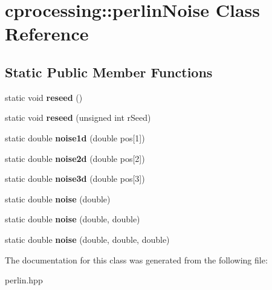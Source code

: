 \hypertarget{classcprocessing_1_1perlinNoise}{\section{cprocessing\-:\-:perlin\-Noise \-Class \-Reference}
\label{classcprocessing_1_1perlinNoise}
}
\subsection*{\-Static \-Public \-Member \-Functions}
\begin{DoxyCompactItemize}
\item 
\hypertarget{classcprocessing_1_1perlinNoise_a882acdba45346139eb9560d911d87c50}{static void {\bfseries reseed} ()}\label{classcprocessing_1_1perlinNoise_a882acdba45346139eb9560d911d87c50}

\item 
\hypertarget{classcprocessing_1_1perlinNoise_ae1fa46303805bdada3b7f0985c24f59b}{static void {\bfseries reseed} (unsigned int r\-Seed)}\label{classcprocessing_1_1perlinNoise_ae1fa46303805bdada3b7f0985c24f59b}

\item 
\hypertarget{classcprocessing_1_1perlinNoise_a2723ae0635c5f9d0de66d9f6c02f43de}{static double {\bfseries noise1d} (double pos\mbox{[}1\mbox{]})}\label{classcprocessing_1_1perlinNoise_a2723ae0635c5f9d0de66d9f6c02f43de}

\item 
\hypertarget{classcprocessing_1_1perlinNoise_a1bd09b9c338bb394589dfe364765ce22}{static double {\bfseries noise2d} (double pos\mbox{[}2\mbox{]})}\label{classcprocessing_1_1perlinNoise_a1bd09b9c338bb394589dfe364765ce22}

\item 
\hypertarget{classcprocessing_1_1perlinNoise_adb6a6c0904b7ae25451e193209a08d4f}{static double {\bfseries noise3d} (double pos\mbox{[}3\mbox{]})}\label{classcprocessing_1_1perlinNoise_adb6a6c0904b7ae25451e193209a08d4f}

\item 
\hypertarget{classcprocessing_1_1perlinNoise_a938a654df217929f8c05a5c151aac520}{static double {\bfseries noise} (double)}\label{classcprocessing_1_1perlinNoise_a938a654df217929f8c05a5c151aac520}

\item 
\hypertarget{classcprocessing_1_1perlinNoise_a28950d882c1226001b7278484e9380af}{static double {\bfseries noise} (double, double)}\label{classcprocessing_1_1perlinNoise_a28950d882c1226001b7278484e9380af}

\item 
\hypertarget{classcprocessing_1_1perlinNoise_a4e5a2fc7ad57fa207ec9d01914e2ee7a}{static double {\bfseries noise} (double, double, double)}\label{classcprocessing_1_1perlinNoise_a4e5a2fc7ad57fa207ec9d01914e2ee7a}

\end{DoxyCompactItemize}


\-The documentation for this class was generated from the following file\-:\begin{DoxyCompactItemize}
\item 
perlin.\-hpp\end{DoxyCompactItemize}
